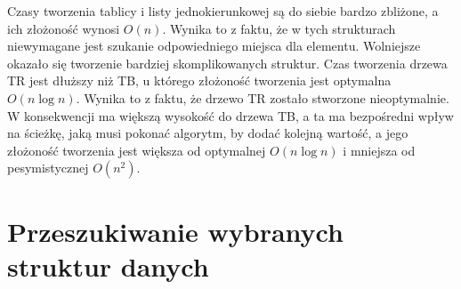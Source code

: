 \documentclass[polish,polish,a4paper]{article}
\begin{document}
Czasy tworzenia tablicy i listy jednokierunkowej są do siebie bardzo zbliżone, a ich złożoność wynosi $O(n)$. Wynika to z faktu, że w tych strukturach niewymagane jest szukanie odpowiedniego miejsca dla elementu. Wolniejsze okazało się tworzenie bardziej skomplikowanych struktur. Czas tworzenia drzewa TR jest dłuższy niż  TB, u którego złożoność tworzenia jest optymalna $O(n\log{n})$. Wynika to z faktu, że drzewo TR zostało stworzone nieoptymalnie. W konsekwencji ma większą wysokość do drzewa TB, a ta ma bezpośredni wpływ na ścieżkę, jaką musi pokonać algorytm, by dodać kolejną wartość, a jego złożoność tworzenia jest większa od optymalnej  $O(n\log{n})$ i mniejsza od pesymistycznej $O(n^2)$.

\section{Przeszukiwanie wybranych struktur danych}	
\end{document}
